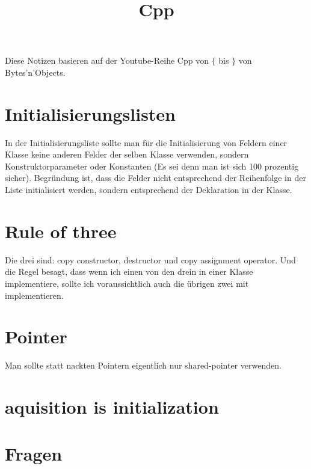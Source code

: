 \documentclass[paper=a4,10pt]{scrartcl}
\begin{document}
\title{Cpp}
Diese Notizen basieren auf der Youtube-Reihe Cpp von $\{$ bis $\}$ von Bytes'n'Objects. 


\section{Initialisierungslisten}
In der Initialisierungsliste sollte man für die Initialisierung von Feldern einer Klasse keine anderen Felder der selben Klasse verwenden, sondern Konstruktorparameter oder Konstanten (Es sei denn man ist sich 100 prozentig sicher). Begründung ist, dass die Felder nicht entsprechend der Reihenfolge in der Liste initialisiert werden, sondern entsprechend der Deklaration in der Klasse.

\section{Rule of three}
Die drei sind: copy constructor, destructor und copy assignment operator. Und die Regel besagt, dass wenn ich einen von den drein in einer Klasse implementiere, sollte ich voraussichtlich auch die übrigen zwei mit implementieren.

\section{Pointer}
Man sollte statt nackten Pointern eigentlich nur shared-pointer verwenden.

\section{aquisition is initialization}



\section{Fragen}
\end{document}
